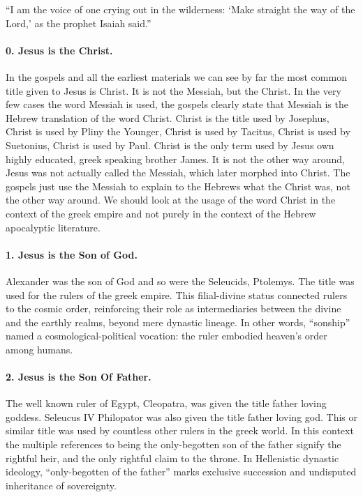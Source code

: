 ``I am the voice of one crying out in the wilderness: `Make straight the way of the Lord,' as the prophet Isaiah said.''

\paragraph{0.
Jesus is the Christ.}\label{par:jesus-is-the-christ.}
In the gospels and all the earliest materials we can see by far the most common title given to Jesus is Christ.
It is not the Messiah, but the Christ.
In the very few cases the word Messiah is used, the gospels clearly state that Messiah is the Hebrew translation of the word Christ.
Christ is the title used by Josephus, Christ is used by Pliny the Younger, Christ is used by Tacitus, Christ is used by Suetonius, Christ is used by Paul.
Christ is the only term used by Jesus own highly educated, greek speaking brother James.
It is not the other way around, Jesus was not actually called the Messiah, which later morphed into Christ.
The gospels just use the Messiah to explain to the Hebrews what the Christ was, not the other way around.
We should look at the usage of the word Christ in the context of the greek empire and not purely in the context of the Hebrew apocalyptic literature.

\paragraph{1.
Jesus is the Son of God.}\label{par:jesus-is-the-son-of-god.}
Alexander was the son of God and so were the Seleucids, Ptolemys.
The title was used for the rulers of the greek empire.
This filial-divine status connected rulers to the cosmic order, reinforcing their role as intermediaries between the divine and the earthly realms, beyond mere dynastic lineage.
In other words, “sonship” named a cosmological-political vocation: the ruler embodied heaven’s order among humans.

\paragraph{2.
Jesus is the Son Of Father.}\label{par:jesus-is-the-son-of-father.}

The well known ruler of Egypt, Cleopatra, was given the title father loving goddess.
Seleucus IV Philopator was also given the title father loving god.
This or similar title was used by countless other rulers in the greek world.
In this context the multiple references to being the only-begotten son of the father signify the rightful heir, and the only rightful claim to the throne.
In Hellenistic dynastic ideology, “only-begotten of the father” marks exclusive succession and undisputed inheritance of sovereignty.

